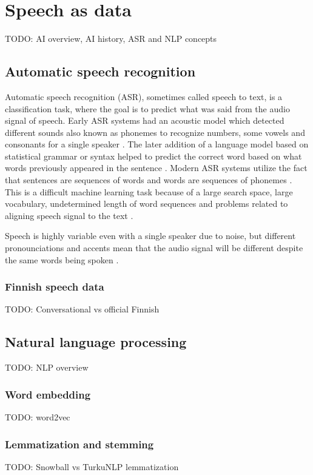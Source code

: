 \documentclass[utf8,english]{gradu3}
\begin{document}
\chapter{Speech as data}
TODO: AI overview, AI history, ASR and NLP concepts

\section{Automatic speech recognition}
Automatic speech recognition (ASR), sometimes called speech to text, is a classification task, where the goal is to predict what was said from the audio signal of speech. Early ASR systems had an acoustic model which detected different sounds also known as phonemes to recognize numbers, some vowels and consonants for a single speaker \parencite{juang2005automatic}. The later addition of a language model based on statistical grammar or syntax helped to predict the correct word based on what words previously appeared in the sentence \parencite{juang2005automatic}. Modern ASR systems utilize the fact that sentences are sequences of words and words are sequences of phonemes \parencite{bengio2014word}. This is a difficult machine learning task because of a large search space, large vocabulary, undetermined length of word sequences and problems related to aligning speech signal to the text \parencite{enarvi2018modeling}.

Speech is highly variable even with a single speaker due to noise, but different pronounciations and accents mean that the audio signal will be different despite the same words being spoken \parencite{juang2005automatic}. 

\subsection{Finnish speech data}
TODO: Conversational vs official Finnish

\section{Natural language processing}
TODO: NLP overview \parencite{silfverberg2016finnpos, kanerva2018turku}

\subsection{Word embedding}
TODO: word2vec

\subsection{Lemmatization and stemming}
TODO: Snowball vs TurkuNLP lemmatization
\end{document}
